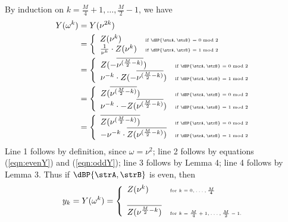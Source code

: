 By induction on $k=\frac{M}{4}+1,\ldots,\frac{M}{2}-1$, we have
\begin{align}
Y(\omega^k)&= Y(\nu^{2k})  \nonumber \\
&= \left\{ \begin{array}{ll}
Z(\nu^{k}) &\mbox{\tiny if
$\dBP{\strA,\strB} = 0 \bmod 2$}\\
\frac{1}{\nu^{k}} \cdot Z(\nu^{k})
&\mbox{\tiny if
$\dBP{\strA,\strB} = 1 \bmod 2$}\\
\end{array} \right. \nonumber\\
&= \left\{ \begin{array}{ll}
Z(- \overline{\nu^{(\frac{M}{2}-k)}}) &\mbox{\tiny if
$\dBP{\strA,\strB} = 0 \bmod 2$}\\
\nu^{-k} \cdot
Z(-\overline{\nu^{(\frac{M}{2}-k)}})
&\mbox{\tiny if
$\dBP{\strA,\strB} = 1 \bmod 2$}\\
\end{array} \right. \nonumber\\
&= \left\{ \begin{array}{ll}
Z(\overline{\nu^{(\frac{M}{2}-k)}}) &\mbox{\tiny if
$\dBP{\strA,\strB} = 0 \bmod 2$}\\
\nu^{-k} \cdot
-Z(\overline{\nu^{(\frac{M}{2}-k)}})
&\mbox{\tiny if
$\dBP{\strA,\strB} = 1 \bmod 2$}\\
\end{array} \right.  \nonumber\\
&= \left\{ \begin{array}{ll}
\overline{Z(\nu^{(\frac{M}{2}-k)})} &\mbox{\tiny if
$\dBP{\strA,\strB} = 0 \bmod 2$}\\
-\nu^{-k} \cdot
\overline{Z(\nu^{(\frac{M}{2}-k)})}
&\mbox{\tiny if
$\dBP{\strA,\strB} = 1 \bmod 2$}\\
\end{array} \right.  \nonumber\\
\end{align}
Line 1 follows by definition, since $\omega=\nu^2$;
line 2 follows by equations (\ref{eqn:evenY}) and
(\ref{eqn:oddY});
line 3 follows by Lemma 4;
line 4 follows by Lemma 3.
Thus if $\dBP{\strA,\strB}$ is even, then
\begin{align}
\label{eqn:trickyRootsOfUnity1}
y_k = Y(\omega^k) = \left\{
\begin{array}{ll}
Z(\nu^k) &\mbox{\tiny for $k=0,\ldots,\frac{M}{4}$}\\
\quad & \quad\\
\overline{Z(\nu^{\frac{M}{2}-k})} &\mbox{\tiny for $k=\frac{M}{4}+1,\ldots,\frac{M}{2}-1$.}\\
\end{array} \right.
\end{align}
